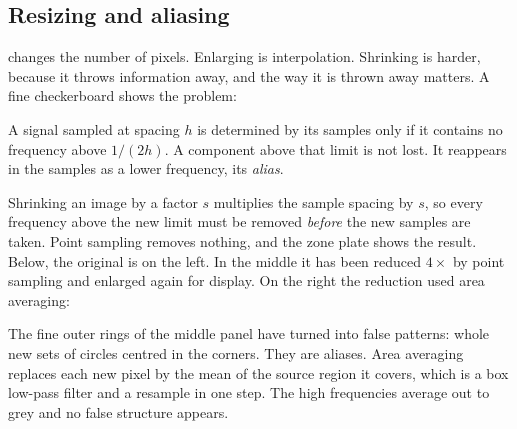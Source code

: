 \subsection{Resizing and aliasing}
\label{ssec:img-resize}

 changes the number of pixels. Enlarging is interpolation.
Shrinking is harder, because it throws information away, and the way it is thrown
away matters. A fine checkerboard shows the problem:

\begin{codepairs}
\end{codepairs}

\begin{theorem}
A signal sampled at spacing \(h\) is determined by its samples only if it
contains no frequency above \(1/(2h)\). A component above that limit is not
lost. It reappears in the samples as a lower frequency, its \emph{alias}.
\end{theorem}

Shrinking an image by a factor \(s\) multiplies the sample spacing by \(s\), so
every frequency above the new limit must be removed \emph{before} the new samples
are taken. Point sampling removes nothing, and the zone plate shows the result.
Below, the original is on the left. In the middle it has been reduced \(4\times\)
by point sampling and enlarged again for display. On the right the reduction used
area averaging:


The fine outer rings of the middle panel have turned into false patterns: whole
new sets of circles centred in the corners. They are aliases. Area averaging
replaces each new pixel by the mean of the source region it covers, which is a box
low-pass filter and a resample in one step. The high frequencies average out to
grey and no false structure appears.

